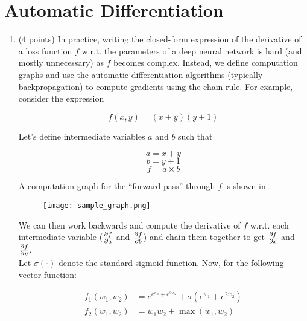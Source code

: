 \documentclass[11pt,english]{article}
\begin{document}
\section{Automatic Differentiation}
\begin{enumerate}[resume]

\item (4 points)
In practice, writing the closed-form expression of the derivative of
a loss function $f$ w.r.t. the parameters of a deep neural network is hard
(and mostly unnecessary) as $f$ becomes complex. Instead, we define
computation graphs and use the automatic differentiation algorithms (typically backpropagation) to compute
gradients using the chain rule. For example, consider the expression

\begin{equation}
f(x, y) = (x+y)(y+1)
\end{equation}

Let's define intermediate variables $a$ and $b$ such that

\begin{equation}
a = x + y
\end{equation}
%
\begin{equation}
b = y + 1
\end{equation}
%
\begin{equation}
f = a \times b
\end{equation}

A computation graph for the ``forward pass'' through $f$ is shown in . 

\begin{figure}[h]
  \centering
    \texttt{[image: sample\_graph.png]}
    \caption{}
    \label{fig:sample_graph}
\end{figure}

We can then work backwards and compute the derivative of $f$ w.r.t. each
intermediate variable ($\frac{\partial f}{\partial a}$ and $\frac{\partial f}{\partial b}$) and
chain them together to get $\frac{\partial f}{\partial x}$ and $\frac{\partial f}{\partial y}$. \\

Let $\sigma(\cdot)$ denote the standard sigmoid function. Now, for the following vector function:

\begin{align}
f_1(w_1, w_2) &= e^{e^{w_1} + e^{2w_2}} + \sigma(e^{w_1} + e^{2w_2}) \\
f_2(w_1, w_2) &= w_1w_2 + \max(w_1, w_2)
\end{align}


\end{enumerate}
\end{document}
